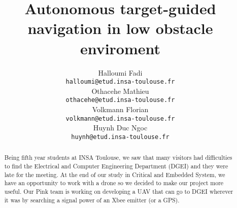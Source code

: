 \documentclass[10pt,a4paper,titlepage]{report}
\author{Halloumi Fadi\\\texttt{halloumi@etud.insa-toulouse.fr}\\
Othacehe Mathieu\\\texttt{othacehe@etud.insa-toulouse.fr}\\
Volkmann Florian\\\texttt{volkmann@etud.insa-toulouse.fr}\\
Huynh Duc Ngoc\\\texttt{huynh@etud.insa-toulouse.fr}}
\title{Autonomous target-guided navigation in low obstacle enviroment}
\begin{document}
\maketitle %
\begin{abstract} %
Being fifth year students at INSA Toulouse, we saw that many visitors had difficulties to find the Electrical and Computer Engineering Department (DGEI) and they were late for the meeting. At the end of our study in Critical and Embedded System, we have an opportunity to work with a drone so we decided to make our project more useful. Our Pink team is working on developing a UAV that can go to DGEI wherever it was by searching a signal power of an Xbee emitter (or a GPS).
\end{abstract}

\tableofcontents %
\clearpage
\end{document}
